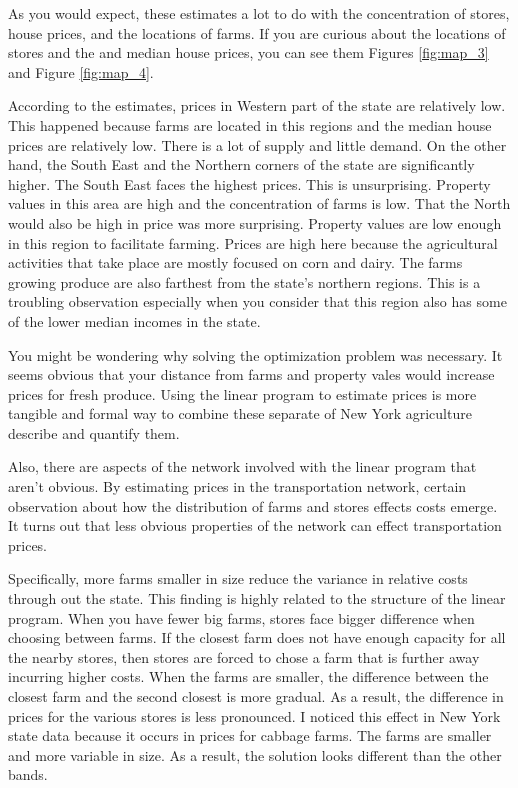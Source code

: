 \documentclass{report}
\begin{document}
As you would expect, these estimates a lot to do with the concentration of stores, house prices, and the locations of farms. If you are curious about the locations of stores and the and median house prices, you can see them Figures \ref{fig:map_3} and Figure \ref{fig:map_4}.

According to the estimates, prices in Western part of the state are relatively low. This happened because farms are located in this regions and the median house prices are relatively low. There is a lot of supply and little demand.  On the other hand, the South East and the Northern corners of the state are significantly higher. The South East faces the highest prices. This is unsurprising. Property values in this area are high and the concentration of farms is low. That the North would also be high in price was more surprising. Property values are low enough in this region to facilitate farming.  Prices are high here because the agricultural activities that take place are mostly focused on corn and dairy. The farms growing produce are also farthest from the state's northern regions. This is a troubling observation especially when you consider that this region also has some of the lower median incomes in the state. 

You might be wondering why solving the optimization problem was necessary. It seems obvious that your distance from farms and property vales would increase prices for fresh produce. Using the linear program to estimate prices is more tangible and formal way to combine these separate of New York agriculture describe and quantify them. 

Also, there are aspects of the network involved with the linear program that aren't obvious. By estimating prices in the transportation network, certain observation about how the distribution of farms and stores effects costs emerge. It turns out that less obvious properties of the network can effect transportation prices. 

Specifically, more farms smaller in size reduce the variance in relative costs through out the state. This finding is highly related to the structure of the linear program. When you have fewer big farms, stores face bigger difference when choosing between farms. If the closest farm does not have enough capacity for all the nearby stores, then stores are forced to chose a farm that is further away incurring higher costs. When the farms are smaller, the difference between the closest farm and the second closest is more gradual. As a result, the difference in prices for the various stores is less pronounced. I noticed this effect in New York state data because it occurs in  prices for cabbage farms. The farms are smaller and more variable in size. As a result, the solution looks different than the other bands.
\end{document}
